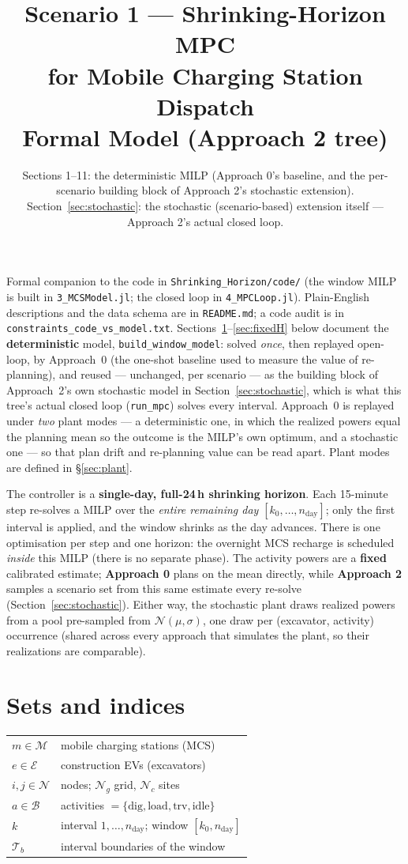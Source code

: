 \documentclass[11pt]{article}
\title{Scenario 1 --- Shrinking-Horizon MPC\\
       for Mobile Charging Station Dispatch\\[2pt]
       \large Formal Model (Approach 2 tree)}
\author{Sections 1--11: the deterministic MILP (Approach 0's baseline, and the per-scenario
building block of Approach 2's stochastic extension). Section~\ref{sec:stochastic}: the
stochastic (scenario-based) extension itself --- Approach 2's actual closed loop.}
\date{}
\begin{document}
\maketitle

Formal companion to the code in \texttt{Shrinking\_Horizon/code/} (the window MILP is
built in \texttt{3\_MCSModel.jl}; the closed loop in \texttt{4\_MPCLoop.jl}). Plain-English
descriptions and the data schema are in \texttt{README.md}; a code audit is in
\texttt{constraints\_code\_vs\_model.txt}. Sections~\ref{sec:sets}--\ref{sec:fixedH} below
document the \textbf{deterministic} model, \texttt{build\_window\_model}: solved \emph{once},
then replayed open-loop, by Approach~0 (the one-shot baseline used to measure the value of
re-planning), and reused --- unchanged, per scenario --- as the building block of Approach~2's
own stochastic model in Section~\ref{sec:stochastic}, which is what this tree's actual closed
loop (\texttt{run\_mpc}) solves every interval. Approach~0 is replayed under \emph{two} plant
modes --- a deterministic one, in which the realized powers equal the planning mean so the
outcome is the MILP's own optimum, and a stochastic one --- so that plan drift and re-planning
value can be read apart. Plant modes are defined in \S\ref{sec:plant}.

The controller is a \textbf{single-day, full-24\,h shrinking horizon}. Each 15-minute step
re-solves a MILP over the \emph{entire remaining day} $[k_0,\dots,n_{\text{day}}]$; only the
first interval is applied, and the window shrinks as the day advances. There is one
optimisation per step and one horizon: the overnight MCS recharge is scheduled \emph{inside}
this MILP (there is no separate phase). The activity powers are a \textbf{fixed} calibrated
estimate; \textbf{Approach 0} plans on the mean directly, while \textbf{Approach 2} samples a
scenario set from this same estimate every re-solve (Section~\ref{sec:stochastic}). Either way,
the stochastic plant draws realized powers from a
pool pre-sampled from $\mathcal{N}(\mu,\sigma)$, one draw per (excavator, activity) occurrence
(shared across every approach that simulates the plant, so their realizations are comparable).

\section{Sets and indices}
\label{sec:sets}
\begin{tabular}{ll}
$m \in \mathcal{M}$ & mobile charging stations (MCS) \\
$e \in \mathcal{E}$ & construction EVs (excavators) \\
$i,j \in \mathcal{N}$ & nodes; $\mathcal{N}_g$ grid, $\mathcal{N}_c$ sites \\
$a \in \mathcal{B}$ & activities $=\{\text{dig},\text{load},\text{trv},\text{idle}\}$ \\
$k$ & interval $1,\dots,n_{\text{day}}$; window $[k_0,n_{\text{day}}]$ \\
$\mathcal{T}_b$ & interval boundaries of the window \\
\end{tabular}
\end{document}
